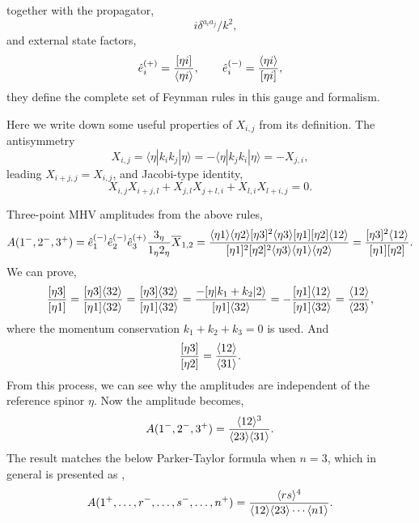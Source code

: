 \documentclass[a4paper,11pt]{article}
\begin{document}
together with the propagator,
\begin{equation*}
    \quad i \delta^{a_i a_j}/k^2,
\end{equation*}
and external state factors,
\begin{equation}
    \hat{e}^{(+)}_i=\frac{[\eta i]}{\langle \eta i \rangle},\qquad \hat{e}^{(-)}_i=\frac{\langle \eta i \rangle}{[\eta i]},
\end{equation}
they define the complete set of Feynman rules in this gauge and formalism.\par
Here we write down some useful properties of $X_{i,j}$ from its definition.
The antisymmetry
\begin{equation}
    X_{i,j}=\langle\eta|k_{i}k_{j}|\eta\rangle=-\langle\eta|k_{j}k_{i}|\eta\rangle=-X_{j,i},
\end{equation}
leading $X_{i+j,j}=X_{i,j}$, and Jacobi-type identity,
\begin{equation}\label{X-relation}
    X_{i,j}X_{i+j,l}+X_{j,l}X_{j+l,i}+X_{l,i}X_{l+i,j}=0.
\end{equation}\par

Three-point MHV amplitudes from the above rules,
\begin{equation}
    A(1^-,2^-,3^+)=\hat{e}^{(-)}_1 \hat{e}^{(-)}_2 \hat{e}^{(+)}_3 \frac{3_{\eta}}{1_{\eta}2_{\eta}}\overline{X}_{1,2}=\frac{\langle \eta 1 \rangle\langle \eta 2 \rangle[\eta 3]^2\langle \eta 3 \rangle[\eta 1][\eta 2]\langle 12 \rangle}{[\eta 1]^2[\eta 2]^2 \langle \eta3 \rangle\langle \eta 1 \rangle\langle \eta 2 \rangle}=\frac{[\eta 3]^2 \langle 12 \rangle}{[\eta 1][\eta 2]}.
\end{equation}
We can prove,
\begin{equation}
    \frac{[\eta 3]}{[\eta 1]}=\frac{[\eta 3]\langle 32 \rangle}{[\eta 1]\langle 32 \rangle}=\frac{[\eta 3]\langle 32 \rangle}{[\eta 1]\langle 32 \rangle}=\frac{-[\eta|k_1+k_2|2\rangle}{[\eta 1]\langle 32 \rangle}=-\frac{[\eta 1]\langle 12 \rangle}{[\eta 1]\langle 32 \rangle}=\frac{\langle 12 \rangle}{\langle 23 \rangle},
\end{equation}
where the momentum conservation $k_1+k_2+k_3=0$ is used. And
\begin{equation}
    \frac{[\eta 3]}{[\eta 2]}=\frac{\langle 12 \rangle}{\langle 31 \rangle}.
\end{equation}
From this process, we can see why the amplitudes are independent of the reference spinor $\eta$. Now the amplitude becomes,
\begin{equation}
    A(1^-,2^-,3^+)=\frac{\langle 12 \rangle^3}{\langle 23 \rangle\langle 31 \rangle}.
\end{equation}
The result matches the below Parker-Taylor formula when $n=3$, which in general is presented as \cite{Parke:1986gb,Berends:1987me},
\begin{equation}\label{pt-formula}
    A(1^+,\dots,r^-,\dots,s^-,\dots,n^+)=\frac{\langle rs \rangle^4}{\langle 12 \rangle\langle 23 \rangle\cdots\langle n1 \rangle}.
\end{equation}
\end{document}
